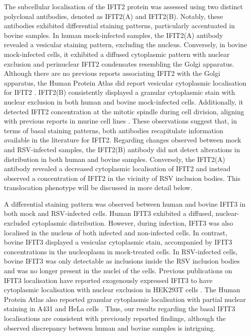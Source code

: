 The subcellular localisation of the IFIT2 protein was assessed using two distinct polyclonal antibodies, denoted as IFIT2(A) and IFIT2(B). Notably, these antibodies exhibited differential staining patterns, particularly accentuated in bovine samples. In human mock-infected samples, the IFIT2(A) antibody revealed a vesicular staining pattern, excluding the nucleus. Conversely, in bovine mock-infected cells, it exhibited a diffused cytoplasmic pattern with nuclear exclusion and perinuclear IFIT2 condensates resembling the Golgi apparatus. Although there are no previous reports associating IFIT2 with the Golgi apparatus, the Human Protein Atlas did report vesicular cytoplasmic localisation for IFIT2 \cite{Thul2017AProteome}. IFIT2(B) consistently displayed a granular cytoplasmic stain with nuclear exclusion in both human and bovine mock-infected cells. Additionally, it detected IFIT2 concentration at the mitotic spindle during cell division, aligning with previous reports in murine cell lines \cite{Saha2006IdentificationProtein}. These observations suggest that, in terms of basal staining patterns, both antibodies recapitulate information available in the literature for IFIT2. Regarding changes observed between mock and RSV-infected samples, the IFIT2(B) antibody did not detect alterations in distribution in both human and bovine samples. Conversely, the IFIT2(A) antibody revealed a decreased cytoplasmic localisation of IFIT2 and instead observed a concentration of IFIT2 in the vicinity of RSV inclusion bodies. This translocation phenotype will be discussed in more detail below.

A differential staining pattern was observed between human and bovine IFIT3 in both mock and RSV-infected cells. Human IFIT3 exhibited a diffused, nuclear-excluded cytoplasmic distribution. However, during infection, IFIT3 was also localised in the nucleus of both infected and non-infected cells. In contrast, bovine IFIT3 displayed a vesicular cytoplasmic stain, accompanied by IFIT3 concentrations in the nucleoplasm in mock-treated cells. In RSV-infected cells, bovine IFIT3 was only detectable as inclusions inside the RSV inclusion bodies and was no longer present in the nuclei of the cells. Previous publications on IFIT3 localisation have reported exogenously expressed IFIT3 to have cytoplasmic localisation with nuclear exclusion in HEK293T cells \cite{Huang2008Interferon-inducedCells, Liu2011IFN-InducedTBK1}. The Human Protein Atlas also reported granular cytoplasmic localisation with partial nuclear staining in A431 and HeLa cells \cite{Thul2017AProteome}. Thus, our results regarding the basal IFIT3 localisations are consistent with previously reported findings, although the observed discrepancy between human and bovine samples is intriguing.

